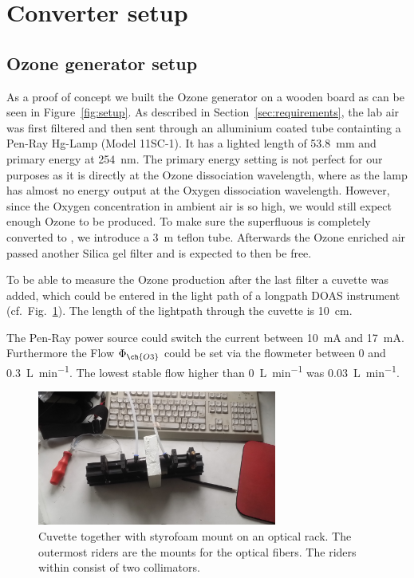 \section{Converter setup}
\label{sec:setup}

\subsection{Ozone generator setup}
\label{sec:ozone-setup}

As a proof of concept we built the Ozone generator on a wooden board
as can be seen in Figure~\ref{fig:setup}. As described in
Section~\ref{sec:requirements}, the lab air was first filtered and
then sent through an alluminium coated tube containting a Pen-Ray
Hg-Lamp (Model 11SC-1). It has a lighted length of
\SI{53.8}{\milli\meter} and primary energy at
\SI{254}{\nano\meter}. The primary energy setting is not perfect for
our purposes as it is directly at the Ozone dissociation wavelength,
where as the lamp has almost no energy output at the Oxygen
dissociation wavelength. However, since the Oxygen concentration in
ambient air is so high, we would still expect enough Ozone to be
produced. 
To make sure the superfluous  is completely converted to
, we introduce a \SI{3}{\meter} teflon tube. Afterwards the
Ozone enriched air passed another Silica gel filter and is expected to
then be  free.

To be able to measure the Ozone production after the last filter a
cuvette was added, which could be entered in the light path of a
longpath DOAS instrument (cf.\ Fig.~\ref{fig:cuvette}). The length of
the lightpath through the cuvette is \SI{10}{\centi\meter}. 

The Pen-Ray power source could switch the current between
\SI{10}{\milli\ampere} and \SI{17}{\milli\ampere}.  Furthermore the
Flow $\Phi_{\ch{O 3}}$ could be set via the flowmeter between \num{0}
and \SI{0.3}{\liter\per\minute}. The lowest stable flow higher than
\SI{0}{\liter\per\minute} was \SI{0.03}{\liter\per\minute}.

\begin{figure}[htbp]
  \centering
  \includegraphics[width=0.7\textwidth]{images/cuvette.jpg}
  \caption{Cuvette together with styrofoam mount on an optical
    rack. The outermost riders are the mounts for the optical
    fibers. The riders within consist of two collimators.}
  \label{fig:cuvette}
\end{figure}

